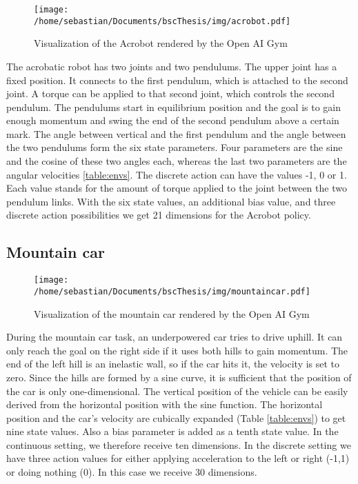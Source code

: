 \begin{wrapfigure}{R}{0.5\textwidth}
    \centering
    \texttt{[image: /home/sebastian/Documents/bscThesis/img/acrobot.pdf]}
    \caption{Visualization of the Acrobot rendered by the Open AI Gym\label{fig:acrobotPygym}}
\end{wrapfigure}

The acrobatic robot has two joints and two pendulums. The upper joint has a fixed position. It connects to the first pendulum, which is attached to the second joint. A torque can be applied to that second joint, which controls the second pendulum. The pendulums start in equilibrium position and the goal is to gain enough momentum and swing the end of the second pendulum above a certain mark. The angle between vertical and the first pendulum and the angle between the two pendulums form the six state parameters. Four parameters are the sine and the cosine of these two angles each, whereas the last two parameters are the angular velocities \ref{table:envs}. The discrete action can have the values -1, 0 or 1. Each value stands for the amount of torque applied to the joint between the two pendulum links. With the six state values, an additional bias value, and three discrete action possibilities we get 21 dimensions for the Acrobot policy.

\subsection{Mountain car}

\begin{wrapfigure}{R}{0.5\textwidth}
    \centering
    \texttt{[image: /home/sebastian/Documents/bscThesis/img/mountaincar.pdf]}
    \caption{Visualization of the mountain car rendered by the Open AI Gym\label{fig:mountaincarPygym}}
\end{wrapfigure}

During the mountain car task, an underpowered car tries to drive uphill. It can only reach the goal on the right side if it uses both hills to gain momentum. The end of the left hill is an inelastic wall, so if the car hits it, the velocity is set to zero. Since the hills are formed by a sine curve, it is sufficient that the position of the car is only one-dimensional. The vertical position of the vehicle can be easily derived from the horizontal position with the sine function. The horizontal position and the car's velocity are cubically expanded (Table \ref{table:envs}) to get nine state values. Also a bias parameter is added as a tenth state value. In the continuous setting, we therefore receive ten dimensions. In the discrete setting we have three action values for either applying acceleration to the left or right (-1,1) or doing nothing (0). In this case we receive 30 dimensions.



